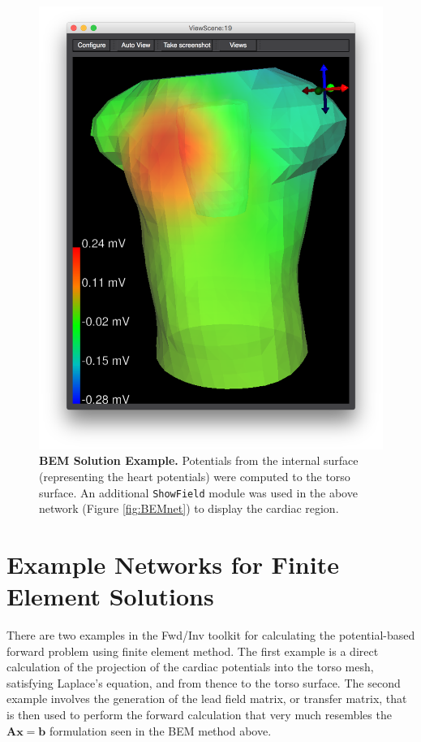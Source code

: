 \begin{figure}[H]
\begin{center}
\includegraphics[width=.9\textwidth]{ECGToolkitGuide_figures/BEMSolution.png}
\caption{{\bf BEM Solution Example.} Potentials from the internal surface (representing the heart potentials) were computed to the torso surface. An additional {\tt ShowField} module was used in the above network (Figure \ref{fig:BEMnet}) to display the cardiac region.}
\label{fig:BEMsol}
\end{center}
\vspace{-.25in}
\end{figure}

\newpage

\section{Example Networks for Finite Element Solutions}

There are two examples in the Fwd/Inv toolkit for calculating the potential-based forward problem using finite element method. The first example is a direct calculation of the projection of the cardiac potentials into the torso mesh, satisfying Laplace's equation, and from thence to the torso surface. 
The second example involves the generation of the lead field matrix, or transfer matrix, that is then used  to perform the forward calculation that very much resembles the $\mathbf{Ax=b}$ formulation seen in the BEM method above.

